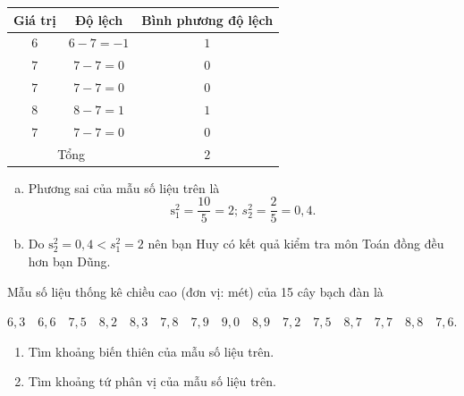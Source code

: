 \begin{bt}
{		\begin{center}
			\begin{tabular}{|c|c|c|}
				\hline
				Giá trị	& Độ lệch & Bình phương độ lệch\\
				\hline
				$6$ & $6-7=-1$ & $1$  \\
				\hline
				$7$ & $7-7=0$ & $0$  \\
				\hline
				$7$ & $7-7=0$ & $0$  \\
				\hline
				$8$ & $8-7=1$ & $1$  \\
				\hline
				$7$ & $7-7=0$ & $0$  \\
				\hline	
				\multicolumn{2}{|c|}{Tổng}  & $2$  \\
				\hline
			\end{tabular}
		\end{center}
		\begin{enumerate}[a)]
			\item Phương sai của mẫu số liệu trên là \\
			\[\mathrm{s}^2_{1}=\dfrac{10}{5}=2;\,s^2_{2}=\dfrac{2}{5}=0{,}4.\]
			\item Do $\mathrm{s}^2_{2} =0{,}4 < s^2_{1} =2$ nên bạn Huy có kết quả kiểm tra môn Toán đồng đều hơn bạn Dũng. 
		\end{enumerate}
	}
\end{bt}

\begin{bt}%
	Mẫu số liệu thống kê chiều cao (đơn vị: mét) của 15 cây bạch đàn là  
	\begin{center}
		$6{,}3\quad 6{,}6\quad 7{,}5\quad 8{,}2\quad 8{,}3\quad 7{,}8\quad 7{,}9\quad 9{,}0\quad 8{,}9\quad7{,}2\quad7{,}5\quad8{,}7\quad7{,}7\quad8{,}8\quad7{,}6.$	
	\end{center}
	\begin{enumerate}
		\item Tìm khoảng biến thiên của mẫu số liệu trên.
		\item Tìm khoảng tứ phân vị của mẫu số liệu trên.
		
	\end{enumerate}
\end{bt}

